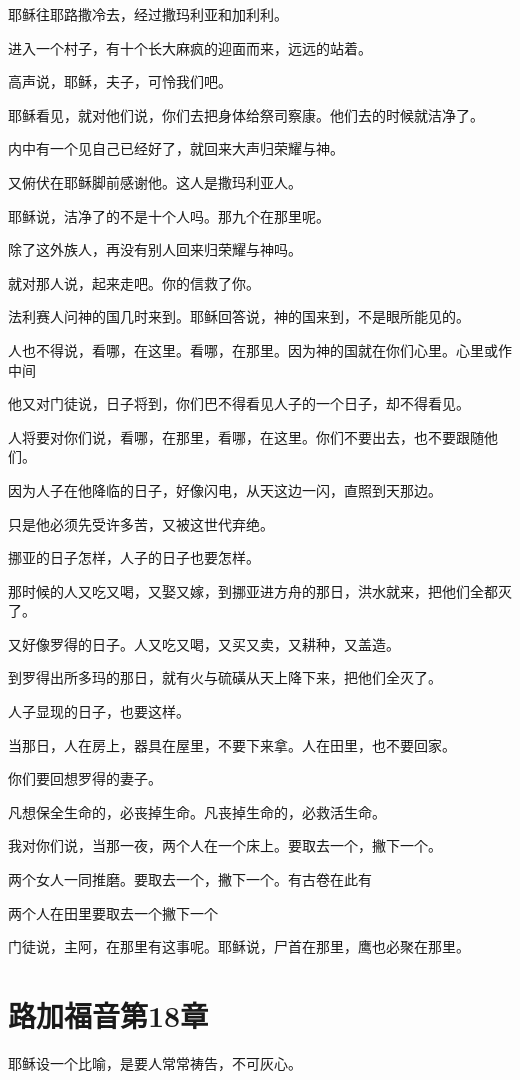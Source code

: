 \documentclass[12pt,oneside]{book}
\begin{document}
耶稣往耶路撒冷去，经过撒玛利亚和加利利。

进入一个村子，有十个长大麻疯的迎面而来，远远的站着。

高声说，耶稣，夫子，可怜我们吧。

耶稣看见，就对他们说，你们去把身体给祭司察康。他们去的时候就洁净了。

内中有一个见自己已经好了，就回来大声归荣耀与神。

又俯伏在耶稣脚前感谢他。这人是撒玛利亚人。

耶稣说，洁净了的不是十个人吗。那九个在那里呢。

除了这外族人，再没有别人回来归荣耀与神吗。

就对那人说，起来走吧。你的信救了你。

法利赛人问神的国几时来到。耶稣回答说，神的国来到，不是眼所能见的。

人也不得说，看哪，在这里。看哪，在那里。因为神的国就在你们心里。心里或作中间

他又对门徒说，日子将到，你们巴不得看见人子的一个日子，却不得看见。

人将要对你们说，看哪，在那里，看哪，在这里。你们不要出去，也不要跟随他们。

因为人子在他降临的日子，好像闪电，从天这边一闪，直照到天那边。

只是他必须先受许多苦，又被这世代弃绝。

挪亚的日子怎样，人子的日子也要怎样。

那时候的人又吃又喝，又娶又嫁，到挪亚进方舟的那日，洪水就来，把他们全都灭了。

又好像罗得的日子。人又吃又喝，又买又卖，又耕种，又盖造。

到罗得出所多玛的那日，就有火与硫磺从天上降下来，把他们全灭了。

人子显现的日子，也要这样。

当那日，人在房上，器具在屋里，不要下来拿。人在田里，也不要回家。

你们要回想罗得的妻子。

凡想保全生命的，必丧掉生命。凡丧掉生命的，必救活生命。

我对你们说，当那一夜，两个人在一个床上。要取去一个，撇下一个。

两个女人一同推磨。要取去一个，撇下一个。有古卷在此有

两个人在田里要取去一个撇下一个

门徒说，主阿，在那里有这事呢。耶稣说，尸首在那里，鹰也必聚在那里。

\chapter{路加福音第18章}
耶稣设一个比喻，是要人常常祷告，不可灰心。
\end{document}
